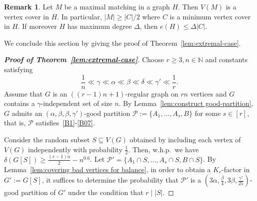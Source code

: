 \documentclass[11pt, a4paper]{article}
\theoremstyle{definition}
\newtheorem{rmk}{Remark}
\newtheorem{claim}[theorem]{Claim}
\newcommand{\<}{\subseteq}
\newcommand{\de}{\delta}
\begin{document}
\begin{rmk}\label{remark:vertex-cover}
Let $M$ be a maximal matching in a graph $H$. Then $V(M)$ is a vertex cover in $H$. In particular, $|M| \geq |C|/2$ where $C$ is a minimum vertex cover {in $H$}. 
If moreover $H$ has maximum degree $\Delta$,  %
then $e(H) \leq \Delta |C|$.
\end{rmk}

We conclude this section by giving the proof of Theorem~\ref{lem:extremal-case}.
\begin{proof}[{\bf Proof of Theorem~\ref{lem:extremal-case}}]
Choose $r\geq 3,n\in \mathbb{N}$ and constants satisfying $$\frac{1}{
n}\ll\gamma\ll \alpha\ll \beta\ll \delta\ll\gamma'\ll \frac{1}{r}.
$$
Assume that $G$ is an $((r-1)n+1)$-regular graph on $rn$ vertices and $G$ contains a $\gamma$-independent set of size $n$.
By Lemma~\ref{lem:construct good-partition}, $G$ admits  an $(\alpha,\beta,\beta,\gamma')$-good partition $\mathcal{P}:=\{A_1,\ldots,A_s,B\}$ for some $s\in [r]$, that is, $\mathcal{P}$ satisfies~\ref{B1}-\ref{B07}. %

Consider the random subset $S\subseteq V(G)$ obtained by including each vertex of $V(G)$ independently with probability $\frac{1}{2}$. Then, w.h.p.~we have {$\de(G[S])\geq \frac{(r-1)n}{2}-n^{0.6}$}. %
Let $\mathcal{P}'=\{A_1\cap S,\ldots,A_s\cap S,B\cap S\}$. By Lemma~\ref{lem:covering bad vertices for balance}, in order to obtain a $K_r$-factor in $G':=G[S]$, it suffices to determine the probability that  $\mathcal{P}'$ is a  $(3\alpha,\frac{\beta}{4},3\beta,\frac{\gamma'}{25})$-good partition of $G'$ under the condition that $r\mid |S|$.  


\end{proof}
\end{document}
